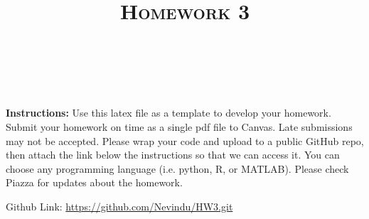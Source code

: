 \documentclass[a4paper]{article}
\title{\textsc{Homework 3}} %
\author{
\red{$>>$Nevindu M. Batagoda$<<$} \\
\red{$>>$9081677594$<<$}\\
}
\date{}
\theoremstyle{definition}
\newenvironment{soln}{
    \leavevmode\color{blue}\ignorespaces
}{}
\begin{document}
\maketitle 


\textbf{Instructions:} 
Use this latex file as a template to develop your homework. Submit your homework on time as a single pdf file to Canvas. Late submissions may not be accepted. Please wrap your code and upload to a public GitHub repo, then attach the link below the instructions so that we can access it. You can choose any programming language (i.e. python, R, or MATLAB). Please check Piazza for updates about the homework. \\


\begin{soln}
	Github Link: \url{https://github.com/Nevindu/HW3.git}
\end{soln}
\end{document}

